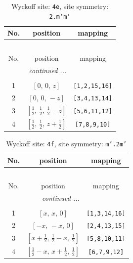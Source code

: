 \documentclass[fleqn,8pt]{jsarticle}
\begin{document}
\renewcommand{\arraystretch}{1.2}
\begin{longtable}{ccc}
\caption{Wyckoff site: {\tt 4e}, site symmetry: {\tt 2.m'm'}}
 \\
 \hline \hline
No. & position & mapping \\ \hline \endfirsthead

\multicolumn{2}{l}{\tablename\ \thetable{}} \\
 \hline \hline
No. & position & mapping \\ \hline \endhead

 \hline \hline
\multicolumn{2}{r}{\footnotesize\it continued ...} \\ \endfoot

 \hline \hline
\multicolumn{2}{r}{} \\ \endlastfoot

1 & $\left[ 0,\, 0,\, z \right]$ & {\tt [1,2,15,16]} \\ \hline
2 & $\left[ 0,\, 0,\, - z \right]$ & {\tt [3,4,13,14]} \\ \hline
3 & $\left[ \frac{1}{2},\, \frac{1}{2},\, \frac{1}{2} - z \right]$ & {\tt [5,6,11,12]} \\ \hline
4 & $\left[ \frac{1}{2},\, \frac{1}{2},\, z + \frac{1}{2} \right]$ & {\tt [7,8,9,10]} \\
\end{longtable}
\renewcommand{\arraystretch}{1.2}
\begin{longtable}{ccc}
\caption{Wyckoff site: {\tt 4f}, site symmetry: {\tt m'.2m'}}
 \\
 \hline \hline
No. & position & mapping \\ \hline \endfirsthead

\multicolumn{2}{l}{\tablename\ \thetable{}} \\
 \hline \hline
No. & position & mapping \\ \hline \endhead

 \hline \hline
\multicolumn{2}{r}{\footnotesize\it continued ...} \\ \endfoot

 \hline \hline
\multicolumn{2}{r}{} \\ \endlastfoot

1 & $\left[ x,\, x,\, 0 \right]$ & {\tt [1,3,14,16]} \\ \hline
2 & $\left[ - x,\, - x,\, 0 \right]$ & {\tt [2,4,13,15]} \\ \hline
3 & $\left[ x + \frac{1}{2},\, \frac{1}{2} - x,\, \frac{1}{2} \right]$ & {\tt [5,8,10,11]} \\ \hline
4 & $\left[ \frac{1}{2} - x,\, x + \frac{1}{2},\, \frac{1}{2} \right]$ & {\tt [6,7,9,12]} \\
\end{longtable}
\end{document}
